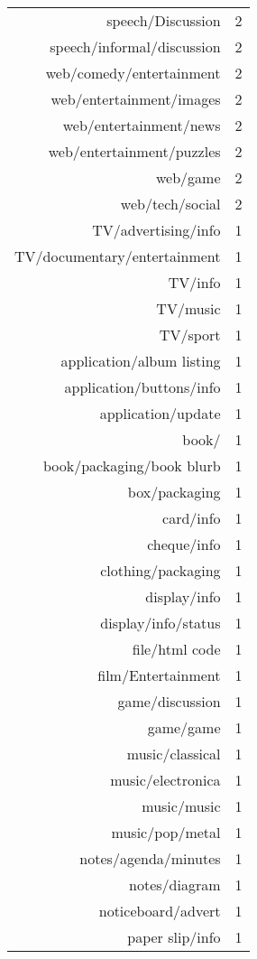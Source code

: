 \begin{table}[ht]
\begin{tabular}{rr}
      speech/Discussion &   2 \\ 
      speech/informal/discussion &   2 \\ 
      web/comedy/entertainment &   2 \\ 
      web/entertainment/images &   2 \\ 
      web/entertainment/news &   2 \\ 
      web/entertainment/puzzles &   2 \\ 
      web/game &   2 \\ 
      web/tech/social &   2 \\ 
      TV/advertising/info &   1 \\ 
      TV/documentary/entertainment &   1 \\ 
      TV/info &   1 \\ 
      TV/music &   1 \\ 
      TV/sport &   1 \\ 
      application/album listing &   1 \\ 
      application/buttons/info &   1 \\ 
      application/update &   1 \\ 
      book/ &   1 \\ 
      book/packaging/book blurb &   1 \\ 
      box/packaging &   1 \\ 
      card/info &   1 \\ 
      cheque/info &   1 \\ 
      clothing/packaging &   1 \\ 
      display/info &   1 \\ 
      display/info/status &   1 \\ 
      file/html code &   1 \\ 
      film/Entertainment &   1 \\ 
      game/discussion &   1 \\ 
      game/game &   1 \\ 
      music/classical &   1 \\ 
      music/electronica &   1 \\ 
      music/music &   1 \\ 
      music/pop/metal &   1 \\ 
      notes/agenda/minutes &   1 \\ 
      notes/diagram &   1 \\ 
      noticeboard/advert &   1 \\ 
      paper slip/info &   1 \\ 

\end{tabular}
\end{table}

